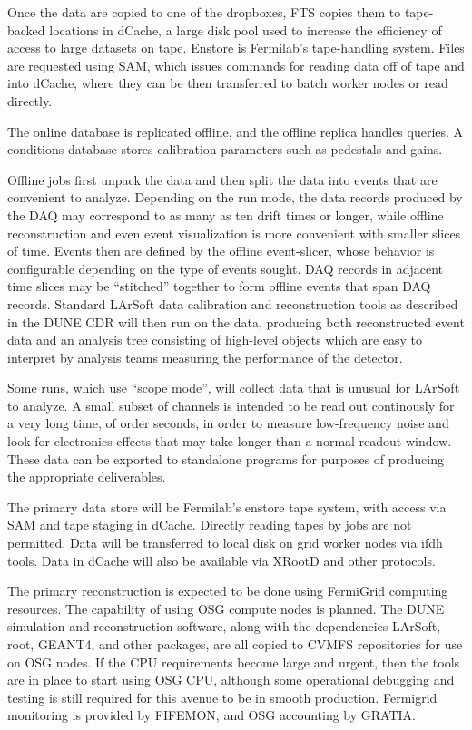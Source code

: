 Once the data are copied to one of the dropboxes, FTS copies them to tape-backed locations in dCache,
a large disk pool used to increase the efficiency of access to large datasets on tape.  Enstore is Fermilab's
tape-handling system.  Files are requested using SAM, which
issues commands for reading data off of tape and into dCache, where they can be then transferred
to batch worker nodes or read directly.  

The online database is replicated offline, and the offline replica handles queries.  A conditions database
stores calibration parameters such as pedestals and gains.

Offline jobs first unpack the data and then split the data into events that are convenient to analyze.
Depending on the run mode, the data records produced by the DAQ may correspond to as many as ten
drift times or longer, while offline reconstruction and even event visualization is more convenient with
smaller slices of time.  Events then are defined by the offline event-slicer, whose behavior is configurable
depending on the type of events sought.  DAQ records in adjacent time slices may be ``stitched'' together
to form offline events that span DAQ records.  Standard LArSoft data calibration and reconstruction tools
as described in the DUNE CDR will then run on the data, producing both reconstructed event data and an
analysis tree consisting of high-level objects which are easy to interpret by analysis teams measuring
the performance of the detector.

Some runs, which use ``scope mode'', will collect data that is unusual for LArSoft to analyze.  A small subset
of channels is intended to be read out continously for a very long time, of order seconds, in order to measure
low-frequency noise and look for electronics effects that may take longer than a normal readout window.
These data can be exported to standalone programs for purposes of producing the appropriate deliverables.

The primary data store will be Fermilab's enstore tape system, with access via SAM and tape staging in
dCache.  Directly reading tapes by jobs are not permitted.  Data will be transferred to local disk on grid
worker nodes via ifdh tools.  Data in dCache will also be available via XRootD and other protocols.

The primary reconstruction is expected to be done using FermiGrid computing resources.  The capability
of using OSG compute nodes is planned.  The DUNE simulation and reconstruction software, along with the
dependencies LArSoft, root, GEANT4, and other packages, are all copied to CVMFS repositories for use on
OSG nodes.  If the CPU requirements become large and urgent, then the tools are in place to start using
OSG CPU, although some operational debugging and testing is still required for this avenue to be in smooth
production.  Fermigrid monitoring is provided by FIFEMON, and OSG accounting by GRATIA.

